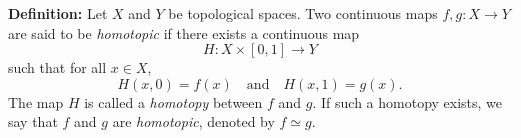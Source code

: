\documentclass{article}
\begin{document}
\textbf{Definition:} Let $X$ and $Y$ be topological spaces. Two continuous maps $f, g : X \to Y$ are said to be \textit{homotopic} if there exists a continuous map 
\[
H : X \times [0, 1] \to Y
\]
such that for all $x \in X$, 
\[
H(x, 0) = f(x) \quad \text{and} \quad H(x, 1) = g(x).
\]
The map $H$ is called a \textit{homotopy} between $f$ and $g$. If such a homotopy exists, we say that $f$ and $g$ are \textit{homotopic}, denoted by $f \simeq g$.
\end{document}
